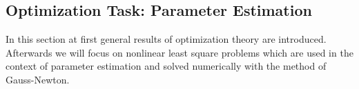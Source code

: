 \documentclass{scrartcl}[12pt, halfparskip]
\numberwithin{equation}{section}
\numberwithin{figure}{section}
\numberwithin{table}{section}
\begin{document}
%
%
%
%
%
%
%
%
%
%
%




\subsection{Optimization Task: Parameter Estimation}

In this section at first general results of optimization theory are introduced. Afterwards we will focus on nonlinear least square problems which are used in the context of parameter estimation and solved numerically with the method of Gauss-Newton.
\end{document}
